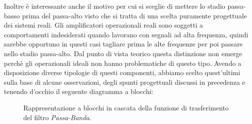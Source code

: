 \documentclass{article}
\begin{document}
    \noindent Inoltre è interessante anche il motivo per cui
    si sceglie di mettere lo stadio passa-basso prima del passa-alto visto che si tratta di una scelta puramente progettuale
    dei sistemi reali. Gli amplificatori operazionali reali sono soggetti a comportamenti indesiderati quando lavorano con segnali
    ad alta frequenza, quindi sarebbe opportuno in questi casi tagliare prima le alte frequenze per poi passare nello stadio passa-alto.
    Dal punto di vista teorico questa distinzione non emerge perchè gli operazionali ideali non hanno problematiche di questo tipo.
    Avendo a disposizione diverse tipologie di questi componenti, abbiamo scelto quest'ultimi sulla base di alcune osservazioni,
    degli spunti progettuali discussi in precedenza e tenendo d'occhio il seguente diagramma a blocchi: \\

    \begin{figure}[H]
      \centering
      \captionsetup{justification=centering, singlelinecheck=false, font=small}
      \caption{Rappresentazione a blocchi in cascata della funzione di trasferimento del filtro \textit{Passa-Banda}.}
      \label{fig:blocco_pb}
    \end{figure}
\end{document}
